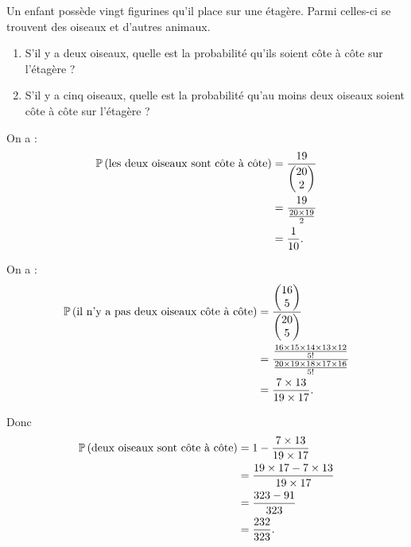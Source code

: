 \begin{exo}
Un enfant possède vingt figurines qu'il place sur une étagère. Parmi celles-ci se trouvent des oiseaux et d'autres animaux.

\begin{enumerate}
    \item S'il y a deux oiseaux, quelle est la probabilité qu'ils soient côte à côte sur l'étagère ? \\
    \item S'il y a cinq oiseaux, quelle est la probabilité qu'au moins deux oiseaux soient côte à côte sur l'étagère ?
\end{enumerate}
\end{exo}

\begin{corr}[1]
On a : \[\begin{aligned}
\proba{\text{les deux oiseaux sont côte à côte}}&=\dfrac{19}{\binom{2}{20}} \\
&=\dfrac{19}{\frac{20\times19}{2}} \\
&=\dfrac{1}{10}.
\end{aligned}\]
\end{corr}

\begin{corr}[2]
On a : \[\begin{aligned}
\proba{\text{il n'y a pas deux oiseaux côte à côte}}&=\dfrac{\binom{5}{16}}{\binom{5}{20}} \\
&=\dfrac{\frac{16\times15\times14\times13\times12}{5!}}{\frac{20\times19\times18\times17\times16}{5!}} \\
&=\dfrac{7\times13}{19\times17}.
\end{aligned}\]

Donc \[\begin{aligned}
\proba{\text{deux oiseaux sont côte à côte}}&=1-\dfrac{7\times13}{19\times17} \\
&=\dfrac{19\times17-7\times13}{19\times17} \\
&=\dfrac{323-91}{323} \\
&=\dfrac{232}{323}.
\end{aligned}\]
\end{corr}

